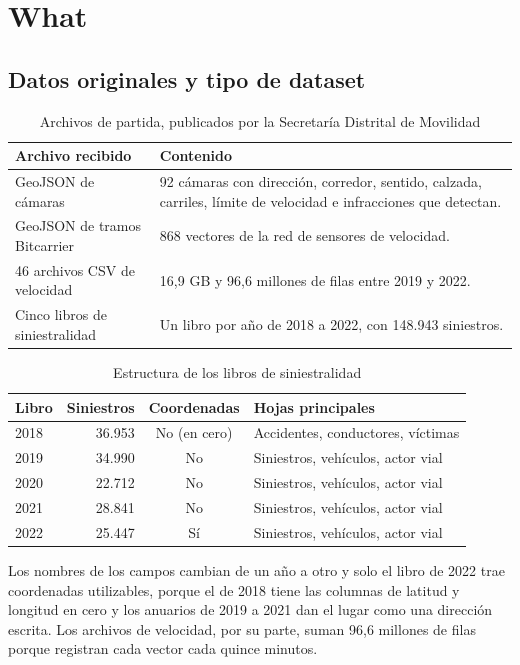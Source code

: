 \documentclass[10pt,a4paper]{article}
\begin{document}
\section{What}

\subsection{Datos originales y tipo de dataset}

\begin{table}[!htbp]\centering\small
\begin{tabularx}{\linewidth}{P{4.2cm}L}
\toprule
\textbf{Archivo recibido} & \textbf{Contenido}\\
\midrule
GeoJSON de cámaras & 92 cámaras con dirección, corredor, sentido, calzada, carriles, límite de velocidad e infracciones que detectan.\\
GeoJSON de tramos Bitcarrier & 868 vectores de la red de sensores de velocidad.\\
46 archivos CSV de velocidad & 16,9 GB y 96,6 millones de filas entre 2019 y 2022.\\
Cinco libros de siniestralidad & Un libro por año de 2018 a 2022, con 148.943 siniestros.\\
\bottomrule
\end{tabularx}
\caption{Archivos de partida, publicados por la Secretaría Distrital de Movilidad \cite{anuarios,camaras,velocidades}}
\end{table}

\begin{table}[!htbp]\centering\small
\begin{tabular}{lrcl}
\toprule
\textbf{Libro} & \textbf{Siniestros} & \textbf{Coordenadas} & \textbf{Hojas principales}\\
\midrule
2018 & 36.953 & No (en cero) & Accidentes, conductores, víctimas\\
2019 & 34.990 & No & Siniestros, vehículos, actor vial\\
2020 & 22.712 & No & Siniestros, vehículos, actor vial\\
2021 & 28.841 & No & Siniestros, vehículos, actor vial\\
2022 & 25.447 & Sí & Siniestros, vehículos, actor vial\\
\bottomrule
\end{tabular}
\caption{Estructura de los libros de siniestralidad}
\end{table}

Los nombres de los campos cambian de un año a otro y solo el libro de 2022 trae coordenadas utilizables, porque el de 2018 tiene las columnas de latitud y longitud en cero y los anuarios de 2019 a 2021 dan el lugar como una dirección escrita. Los archivos de velocidad, por su parte, suman 96,6 millones de filas porque registran cada vector cada quince minutos.
\end{document}
